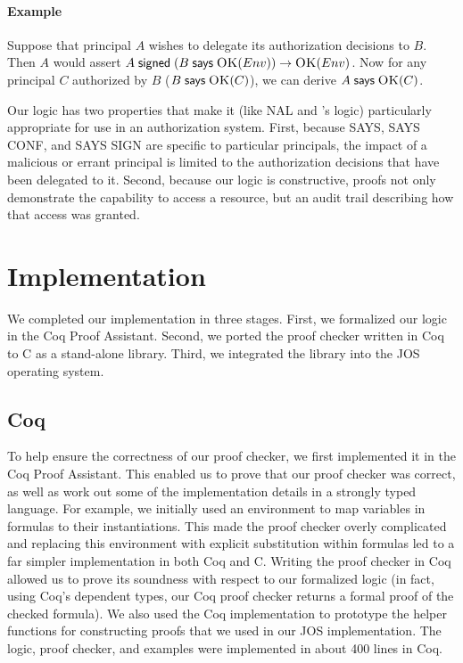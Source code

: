 \documentclass[10pt]{article}
\newcommand{\ruletext}[1]{{\scriptsize\textsf{#1}}}
\newcommand{\saysrule}{\ruletext{SAYS}}
\newcommand{\sayssignrule}{\ruletext{SAYS SIGN}}
\newcommand{\saysconfrule}{\ruletext{SAYS CONF}}
\newcommand{\sign}[2]{\ensuremath{#1\;\textsf{signed}\;#2}}
\newcommand{\imp}[2]{\ensuremath{#1 \rightarrow #2}}
\newcommand{\says}[2]{\ensuremath{#1\;\textsf{says}\;#2}}
\newcommand{\pred}[2]{\ensuremath{\textsc{#1}(#2)}}
\begin{document}
\paragraph{Example} Suppose that principal $A$ wishes to delegate its authorization decisions to $B$. Then $A$ would assert \sign{A}{\imp{(\says{B}{\pred{OK}{Env}})}{\pred{OK}{Env}}}. Now for any principal $C$ authorized by $B$ (\says{B}{\pred{OK}{C}}), we can derive \says{A}{\pred{OK}{C}}.

\medskip
Our logic has two properties that make it (like NAL and \citet{Bauer}'s logic) particularly appropriate for use in an authorization system. First, because \saysrule{}, \saysconfrule{}, and \sayssignrule{} are specific to particular principals, the impact of a malicious or errant principal is limited to the authorization decisions that have been delegated to it.
Second, because our logic is constructive, proofs not only demonstrate the capability to access a resource, but an audit trail describing how that access was granted.

\section{Implementation}
\label{sec:impl}

We completed our implementation in three stages.  First, we formalized our logic in the Coq Proof Assistant.  Second, we ported the proof checker written in Coq to C as a stand-alone library.  Third, we integrated the library into the JOS operating system.

\subsection{Coq}
To help ensure the correctness of our proof checker, we first implemented it in the Coq Proof Assistant. This enabled us to prove that our proof checker was correct, as well as work out some of the implementation details in a strongly typed language.
For example, we initially used an environment to map variables in formulas to their instantiations. This made the proof checker overly complicated and replacing this environment with explicit substitution within formulas led to a far simpler implementation in both Coq and C.  Writing the proof checker in Coq allowed us to prove its soundness with respect to our formalized logic (in fact, using Coq's dependent types, our Coq proof checker returns a formal proof of the checked formula). We also used the Coq implementation to prototype the helper functions for constructing proofs that we used in our JOS implementation. The logic, proof checker, and examples were implemented in about 400 lines in Coq.
\end{document}
